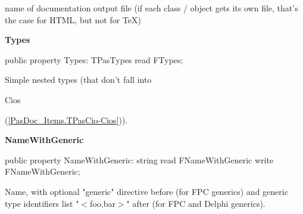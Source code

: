 \documentclass{report}
\newif\ifpdf
\begin{document}
\begin{list}{}
\begin{flushleft}
\ifpdf
\end{flushleft}
\fi


\par name of documentation output file (if each class / object gets its own file, that's the case for HTML, but not for TeX)\label{PasDoc_Items.TPasCio-Types}
\item[\textbf{Types}\hfill]
\ifpdf
\begin{flushleft}
\fi
\begin{ttfamily}
public property Types: TPasTypes read FTypes;\end{ttfamily}

\ifpdf
\end{flushleft}
\fi


\par Simple nested types (that don't fall into \begin{ttfamily}Cios\end{ttfamily}(\ref{PasDoc_Items.TPasCio-Cios})).\label{PasDoc_Items.TPasCio-NameWithGeneric}
\item[\textbf{NameWithGeneric}\hfill]
\ifpdf
\begin{flushleft}
\fi
\begin{ttfamily}
public property NameWithGeneric: string read FNameWithGeneric write FNameWithGeneric;\end{ttfamily}

\ifpdf
\end{flushleft}
\fi


\par Name, with optional "generic" directive before (for FPC generics) and generic type identifiers list "{$<$}foo,bar{$>$}" after (for FPC and Delphi generics).\end{list}
\end{document}
